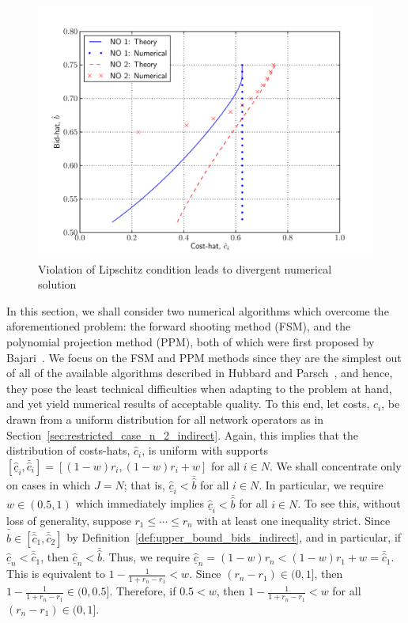 \begin{figure}[t]
  \includegraphics[width=\figsize]{Indirect/Figures/lipschitz}
  \caption{Violation of Lipschitz condition leads to divergent numerical solution}
  \label{fig:lipschitz_indirect}
\end{figure}

In this section, we shall consider two numerical algorithms which overcome the aforementioned problem: the forward shooting method (FSM), and the polynomial projection method (PPM), both of which were first proposed by Bajari~\cite{Bajari2001a}. We focus on the FSM and PPM methods since they are the simplest out of all of the available algorithms described in Hubbard and Parsch~\cite{HubbardPaarsch2011}, and hence, they pose the least technical difficulties when adapting to the problem at hand, and yet yield numerical results of acceptable quality. To this end, let costs, $c_i$, be drawn from a uniform distribution for all network operators as in Section~\ref{sec:restricted_case_n_2_indirect}. Again, this implies that the distribution of costs-hats, $\hat{c}_i$, is uniform with supports $[\underline{\hat{c}}_i, \bar{\hat{c}}_i] = [(1-w)r_i, (1-w)r_i + w]$ for all $i\in N$. We shall concentrate only on cases in which $J=N$; that is, $\underline{\hat{c}}_i < \bar{\hat{b}}$ for all $i\in N$. In particular, we require $w\in\left(0.5, 1\right)$ which immediately implies $\underline{\hat{c}}_i < \bar{\hat{b}}$ for all $i\in N$. To see this, without loss of generality, suppose $r_1\leq\cdots\leq r_n$ with at least one inequality strict. Since $\bar{\hat{b}}\in[\bar{\hat{c}}_1, \bar{\hat{c}}_2]$ by Definition~\ref{def:upper_bound_bids_indirect}, and in particular, if $\underline{\hat{c}}_n < \bar{\hat{c}}_1$, then $\underline{\hat{c}}_n < \bar{\hat{b}}$. Thus, we require $\underline{\hat{c}}_n = (1-w)r_n < (1-w)r_1 + w = \bar{\hat{c}}_1$. This is equivalent to $1 - \frac{1}{1+r_n-r_1} < w$. Since $(r_n - r_1)\in (0, 1]$, then $1 - \frac{1}{1+r_n-r_1} \in (0,0.5]$. Therefore, if $0.5 < w$, then $1 - \frac{1}{1+r_n-r_1} < w$ for all $(r_n-r_1)\in (0,1]$.

